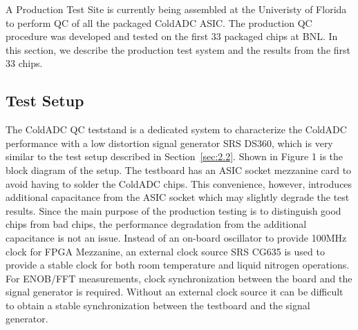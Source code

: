 \label{sec:6}


A Production Test Site is currently being assembled at the Univeristy of Florida to perform QC of all the packaged ColdADC ASIC.  The production QC procedure was developed and tested on the first 33 packaged chips at BNL. In this section, we describe the production test system and the results from the first 33 chips.

\subsection{Test Setup}
\label{sec:6.1}
The ColdADC QC teststand is a dedicated system to characterize the ColdADC performance with a low distortion 
signal generator SRS DS360, which is very similar to the test setup described in Section~\ref{sec:2.2}.  Shown in Figure 1 
is the block diagram of the setup. The testboard has an ASIC socket mezzanine card to avoid having to solder the ColdADC chips. 
This convenience, however, introduces additional capacitance from the ASIC socket which may slightly degrade the test results.
Since the main purpose of the production testing is to distinguish good chips from bad chips, the performance degradation 
from the additional capacitance is not an issue. 
Instead of an on-board oscillator to provide 100MHz clock for FPGA Mezzanine, an external clock source SRS CG635 is used to provide a 
stable clock for both room temperature and liquid nitrogen operations. For ENOB/FFT measurements, clock synchronization between the 
board and the signal generator is required.  Without an external clock source it can be difficult to obtain a stable synchronization 
between the testboard and the signal generator. 

